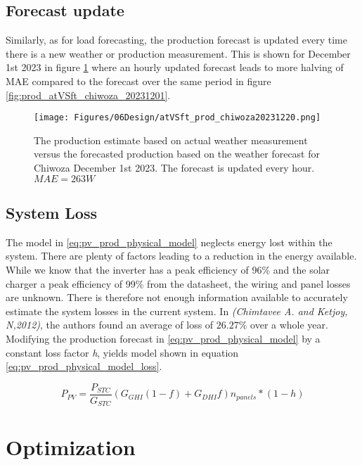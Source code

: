 
\subsection{Forecast update}
Similarly, as for load forecasting, the production forecast is updated every time there is a new weather or production measurement. This is shown for December 1st 2023 in figure \ref{fig:atVSft_prod_chiwoza20231220} where an hourly updated forecast leads to more halving of MAE compared to the forecast over the same period in figure \ref{fig:prod_atVSft_chiwoza_20231201}.

\begin{figure}
    \centering
    \texttt{[image: Figures/06Design/atVSft\_prod\_chiwoza20231220.png]}
    \caption[Forecasted vs estimated potential production hourly update]{The production estimate based on actual weather measurement versus the forecasted production based on the weather forecast for Chiwoza December 1st 2023. The forecast is updated every hour. $MAE = 263W$}
    \label{fig:atVSft_prod_chiwoza20231220}
\end{figure}

\subsection{System Loss}
The model in \ref{eq:pv_prod_physical_model} neglects energy lost within the system. There are plenty of factors leading to a reduction in the energy available. While we know that the inverter has a peak efficiency of 96\% and the solar charger a peak efficiency of 99\% from the datasheet, the wiring and panel losses are unknown. There is therefore not enough information available to accurately estimate the system losses in the current system. In \textit{(Chimtavee A. and Ketjoy, N,2012)}, the authors found an average of loss of $26.27\%$ over a whole year.\cite{Chimtavee2012-gg} Modifying the production forecast in \ref{eq:pv_prod_physical_model} by a constant loss factor \textit{h}, yields model shown in equation \ref{eq:pv_prod_physical_model_loss}.

\begin{equation}
    P_{PV} = \frac{P_{STC}}{G_{STC}}(G_{GHI}(1-f)+G_{DHI}f)n_{panels}*(1-h)
    \label{eq:pv_prod_physical_model_loss}
\end{equation}

\section{Optimization}\label{sec:optimization}

